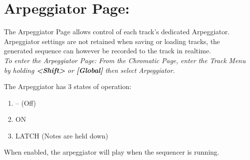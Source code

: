 \chapter{Arpeggiator Page:}
The Arpeggiator Page allows control of each track's dedicated Arpeggiator. Arpeggiator settings are not retained when saving or loading tracks, the generated sequence can however be recorded to the track in realtime.
\\
\textit{To enter the Arpeggiator Page: From the Chromatic Page, enter the Track Menu by holding \textbf{<Shift>} or \textbf{[Global]} then select Arpeggiator. }

The Arpeggiator has 3 states of operation:
\begin{enumerate}
    \item -- (Off)
    \item ON
    \item LATCH (Notes are held down)
\end{enumerate}

When enabled, the arpeggiator will  play when the sequencer is running. 

